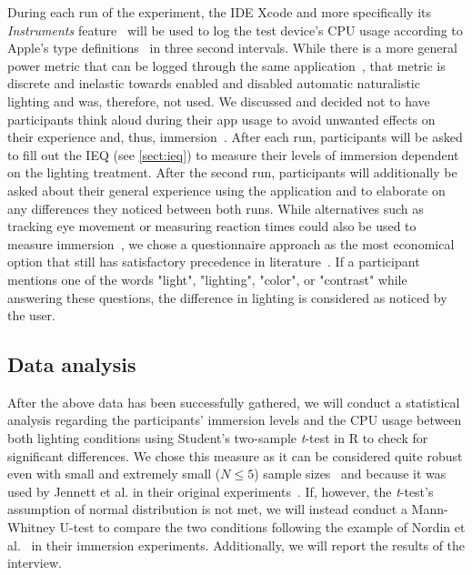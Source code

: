 \documentclass[12pt,twoside,english]{article}
\begin{document}
During each run of the experiment, the \gls{IDE} Xcode and more specifically its \textit{Instruments} feature~\cite{apple_xcode_nodate} will be used to log the test device's \gls{CPU} usage according to Apple's type definitions~\cite{apple_system_nodate} in three second intervals.
While there is a more general power metric that can be logged through the same application~\cite{apple_energy_nodate-1}, that metric is discrete and inelastic towards enabled and disabled automatic naturalistic lighting and was, therefore, not used.
We discussed and decided not to have participants think aloud during their app usage to avoid unwanted effects on their experience and, thus, immersion~\cite{van_den_haak_retrospective_2003}.
After each run, participants will be asked to fill out the \gls{IEQ} (see \ref{sect:ieq}) to measure their levels of immersion dependent on the lighting treatment.
After the second run, participants will additionally be asked about their general experience using the application and to elaborate on any differences they noticed between both runs.
While alternatives such as tracking eye movement or measuring reaction times could also be used to measure immersion~\cite{jennett_measuring_2008}, we chose a questionnaire approach as the most economical option that still has satisfactory precedence in literature~\cite{boyle_engagement_2012}.
If a participant mentions one of the words "light", "lighting", "color", or "contrast" while answering these questions, the difference in lighting is considered as noticed by the user.

\subsection{Data analysis}
\label{sect:data_analysis}

After the above data has been successfully gathered, we will conduct a statistical analysis regarding the participants' immersion levels and the \gls{CPU} usage between both lighting conditions using Student's two-sample \textit{t}-test in R to check for significant differences.
We chose this measure as it can be considered quite robust even with small and extremely small ($ N \leq 5 $) sample sizes~\cite{de_winter_using_2013} and because it was used by Jennett et al. in their original experiments~\cite{jennett_measuring_2008}.
If, however, the \textit{t}-test's assumption of normal distribution is not met, we will instead conduct a Mann-Whitney U-test to compare the two conditions following the example of Nordin et al.~\cite{nordin_attention_2013} in their immersion experiments.
Additionally, we will report the results of the interview.
\end{document}

